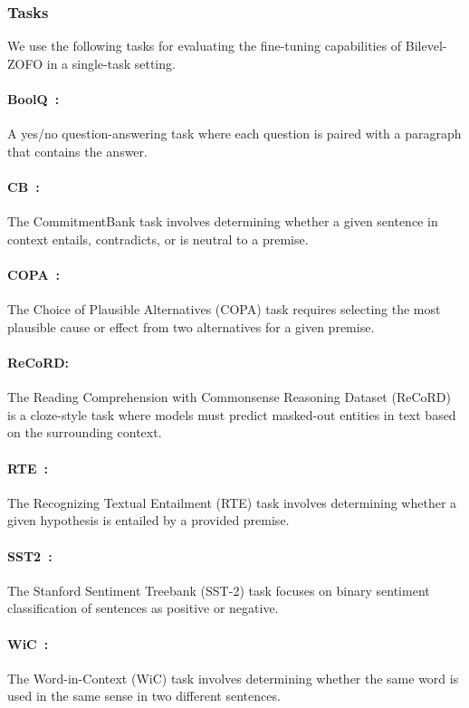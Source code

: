 \subsubsection{Tasks}
We use the following tasks for evaluating the fine-tuning capabilities of Bilevel-ZOFO in a single-task setting.
\paragraph{BoolQ~\citep{clark2019boolq}:} A yes/no question-answering task where each question is paired with a paragraph that contains the answer.

\paragraph{CB~\citep{wang2019superglue-cb}:} The CommitmentBank task involves determining whether a given sentence in context entails, contradicts, or is neutral to a premise.

\paragraph{COPA~\citep{roemmele2011copa}:} The Choice of Plausible Alternatives (COPA) task requires selecting the most plausible cause or effect from two alternatives for a given premise.

\paragraph{ReCoRD:~\citep{zhang2018record}} The Reading Comprehension with Commonsense Reasoning Dataset (ReCoRD) is a cloze-style task where models must predict masked-out entities in text based on the surrounding context.

\paragraph{RTE~\citep{wang2018gluesst2}:} The Recognizing Textual Entailment (RTE) task involves determining whether a given hypothesis is entailed by a provided premise.

\paragraph{SST2~\citep{wang2018gluesst2}:} The Stanford Sentiment Treebank (SST-2) task focuses on binary sentiment classification of sentences as positive or negative.

\paragraph{WiC~\citep{pilehvar2018wic}:} The Word-in-Context (WiC) task involves determining whether the same word is used in the same sense in two different sentences.

